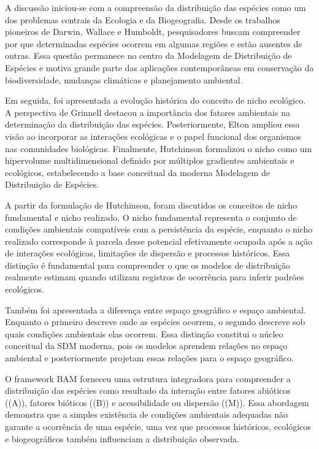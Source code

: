 A discussão iniciou-se com a compreensão da distribuição das espécies como um dos problemas centrais da Ecologia e da Biogeografia. Desde os trabalhos pioneiros de Darwin, Wallace e Humboldt, pesquisadores buscam compreender por que determinadas espécies ocorrem em algumas regiões e estão ausentes de outras. Essa questão permanece no centro da Modelagem de Distribuição de Espécies e motiva grande parte das aplicações contemporâneas em conservação da biodiversidade, mudanças climáticas e planejamento ambiental.

Em seguida, foi apresentada a evolução histórica do conceito de nicho ecológico. A perspectiva de Grinnell destacou a importância dos fatores ambientais na determinação da distribuição das espécies. Posteriormente, Elton ampliou essa visão ao incorporar as interações ecológicas e o papel funcional dos organismos nas comunidades biológicas. Finalmente, Hutchinson formalizou o nicho como um hipervolume multidimensional definido por múltiplos gradientes ambientais e ecológicos, estabelecendo a base conceitual da moderna Modelagem de Distribuição de Espécies.

A partir da formulação de Hutchinson, foram discutidos os conceitos de nicho fundamental e nicho realizado. O nicho fundamental representa o conjunto de condições ambientais compatíveis com a persistência da espécie, enquanto o nicho realizado corresponde à parcela desse potencial efetivamente ocupada após a ação de interações ecológicas, limitações de dispersão e processos históricos. Essa distinção é fundamental para compreender o que os modelos de distribuição realmente estimam quando utilizam registros de ocorrência para inferir padrões ecológicos.

Também foi apresentada a diferença entre espaço geográfico e espaço ambiental. Enquanto o primeiro descreve onde as espécies ocorrem, o segundo descreve sob quais condições ambientais elas ocorrem. Essa distinção constitui o núcleo conceitual da SDM moderna, pois os modelos aprendem relações no espaço ambiental e posteriormente projetam essas relações para o espaço geográfico.

O framework BAM forneceu uma estrutura integradora para compreender a distribuição das espécies como resultado da interação entre fatores abióticos ((A)), fatores bióticos ((B)) e acessibilidade ou dispersão ((M)). Essa abordagem demonstra que a simples existência de condições ambientais adequadas não garante a ocorrência de uma espécie, uma vez que processos históricos, ecológicos e biogeográficos também influenciam a distribuição observada.

